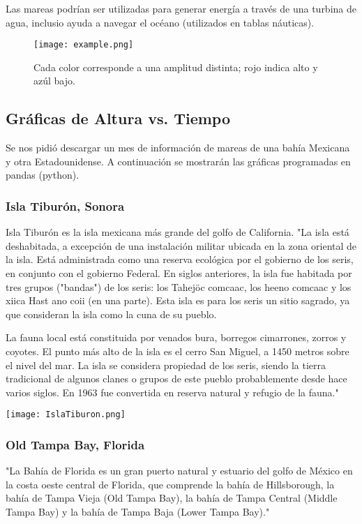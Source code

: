 \documentclass[12pt]{article}
\begin{document}
Las mareas podrían ser utilizadas para generar energía a través de una turbina de agua, inclusio ayuda a navegar el océano (utilizados en tablas náuticas).
\begin{figure}[H]
\texttt{[image: example.png]}
\caption{Cada color corresponde a una amplitud distinta; rojo indica alto y az\'ul bajo.}
\end{figure}

\newpage
\subsection*{Gráficas de Altura vs. Tiempo}

Se nos pidió descargar un mes de información de mareas de una bahía Mexicana y otra Estadounidense. A continuación se mostrarán las gráficas programadas en pandas (python).

\subsubsection*{Isla Tibur\'on, Sonora}
Isla Tibur\'on es la isla mexicana m\'as grande del golfo de California. "La isla está deshabitada, a excepción de una instalación militar ubicada en la zona oriental de la isla. Está administrada como una reserva ecológica por el gobierno de los seris, en conjunto con el gobierno Federal. En siglos anteriores, la isla fue habitada por tres grupos ("bandas") de los seris: los Tahejöc comcaac, los heeno comcaac y los xiica Hast ano coii (en una parte). Esta isla es para los seris un sitio sagrado, ya que consideran la isla como la cuna de su pueblo.

La fauna local está constituida por venados bura, borregos cimarrones, zorros y coyotes. El punto más alto de la isla es el cerro San Miguel, a 1450 metros sobre el nivel del mar. La isla se considera propiedad de los seris, siendo la tierra tradicional de algunos clanes o grupos de este pueblo probablemente desde hace varios siglos. En 1963 fue convertida en reserva natural y refugio de la fauna." \cite{f}

\begin{center}
\texttt{[image: IslaTiburon.png]}
\end{center}

\newpage
\subsubsection*{Old Tampa Bay, Florida}
"La Bah\'ia de Florida es un gran puerto natural y estuario del golfo de México en la costa oeste central de Florida, que comprende la bahía de Hillsborough, la bahía de Tampa Vieja (Old Tampa Bay), la bahía de Tampa Central (Middle Tampa Bay) y la bahía de Tampa Baja (Lower Tampa Bay)."\cite{g}
\end{document}
